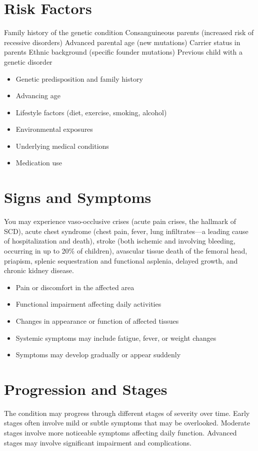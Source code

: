 \section{Risk Factors}
Family history of the genetic condition Consanguineous parents (increased risk of recessive disorders) Advanced parental age (new mutations) Carrier status in parents Ethnic background (specific founder mutations) Previous child with a genetic disorder

\begin{itemize}[noitemsep]
  \item Genetic predisposition and family history
  \item Advancing age
  \item Lifestyle factors (diet, exercise, smoking, alcohol)
  \item Environmental exposures
  \item Underlying medical conditions
  \item Medication use
\end{itemize}
\section{Signs and Symptoms}
You may experience vaso-occlusive crises (acute pain crises, the hallmark of SCD), acute chest syndrome (chest pain, fever, lung infiltrates---a leading cause of hospitalization and death), stroke (both ischemic and involving bleeding, occurring in up to 20\% of children), avascular tissue death of the femoral head, priapism, splenic sequestration and functional asplenia, delayed growth, and chronic kidney disease.

\begin{itemize}[noitemsep]
  \item Pain or discomfort in the affected area
  \item Functional impairment affecting daily activities
  \item Changes in appearance or function of affected tissues
  \item Systemic symptoms may include fatigue, fever, or weight changes
  \item Symptoms may develop gradually or appear suddenly
\end{itemize}
\section{Progression and Stages}
The condition may progress through different stages of severity over time. Early stages often involve mild or subtle symptoms that may be overlooked. Moderate stages involve more noticeable symptoms affecting daily function. Advanced stages may involve significant impairment and complications.
